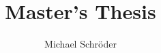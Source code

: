 \documentclass[a4paper,12pt]{book}
\begin{document}
\frontmatter

\title{Master's Thesis}
\author{Michael Schröder}
\date{\draftnotice}
\maketitle
\clearemptydoublepage




\mainmatter







\backmatter


\end{document}
